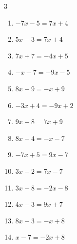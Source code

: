\begin{multicols}{3}
\begin{enumerate}
        \phantom{$\displaystyle x=1$}

  \item $-7x-5=7x+4$


  \item $5x-3=7x+4$


  \item $7x+7=-4x+5$


  \item $-x-7=-9x-5$


  \item $8x-9=-x+9$

        \phantom{$\displaystyle x=2$}

  \item $-3x+4=-9x+2$


  \item $9x-8=7x+9$


\columnbreak %

  \item $8x-4=-x-7$


  \item $-7x+5=9x-7$


  \item $3x-2=7x-7$


  \item $3x-8=-2x-8$

        \phantom{$\displaystyle x=0$}

  \item $4x-3=9x+7$

        \phantom{$\displaystyle x=-2$}

  \item $8x-3=-x+8$


  \item $x-7=-2x+8$


\end{enumerate}
\end{multicols}

